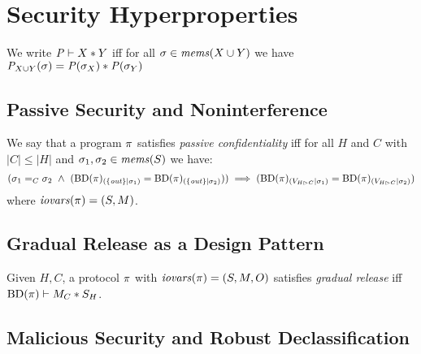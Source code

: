 \section{Security Hyperproperties}

\begin{definition}
  We write $\mathit{P} \vdash X * Y$ iff for all
    $\sigma \in \mathit{mems}(X \cup Y)$ we have
  ${\mathit{P}}_{X \cup Y}(\sigma) =
  \mathit{P}(\sigma_X) * \mathit{P}(\sigma_Y)$
\end{definition}


\subsection{Passive Security and Noninterference}


\begin{definition}
  \label{definition-NIMO}
  We say that a program $\pi$ satisfies \emph{passive confidentiality}
  iff for all $H$ and $C$ with $|C|\le|H|$ and 
  $\sigma_1,\sigma_2 \in \mathit{mems}(S)$ we have:
  $$
  (\store_1 =_C \store_2 \ \wedge \ 
  (\condd{\progtt(\prog)}{\{ \outv \}}{\store_1} = \condd{\progtt(\prog)}{\{ \outv \}}{\store_2}))
  \implies 
  (\condd{\progtt(\prog)}{\houtputs}{\store_1} = \condd{\progtt(\prog)}{\houtputs}{\store_2})
  $$
  where $\mathit{iovars}(\pi) = (S,M)$.
\end{definition}

\subsection{Gradual Release as a Design Pattern}

\begin{definition}
  Given $H,C$, a protocol $\pi$ with $\mathit{iovars}(\pi) = (S,M,O)$ satisfies \emph{gradual release} iff
  $\mathrm{BD}(\pi) \vdash M_C * S_H$.
\end{definition}

\subsection{Malicious Security and Robust Declassification}


